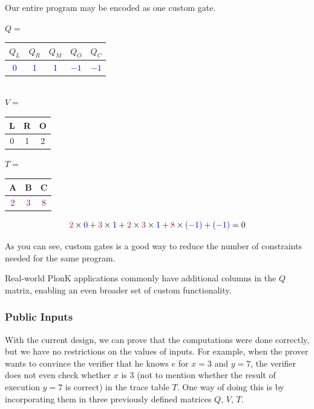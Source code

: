 \documentclass[../../book.tex]{subfiles}
\begin{document}
\begin{example}
Our entire program may be encoded as one custom gate.
\begin{center}
$Q=$ 
\begin{tabular}{|c|c|c|c|c|}
\hline
\rowcolor{gray!30}$Q_L$ & $Q_R$ & $Q_M$ & $Q_O$ & $Q_C$ \\ 
\hline
\textcolor{blue}{0} & \textcolor{blue}{1} & \textcolor{blue}{1} & \textcolor{blue}{$-1$} & \textcolor{blue}{$-1$} \\ 
\hline
\end{tabular}
\vspace{0.2cm}
\\ $V=$
\begin{tabular}{|c|c|c|}
\hline
\rowcolor{gray!30}L & R & O \\
\hline
0 & 1 & 2 \\
\hline
\end{tabular}
\quad $T=$
\begin{tabular}{|c|c|c|}
\hline
\rowcolor{gray!30}A & B & C \\
\hline
\textcolor{purple}{2} & \textcolor{purple}{3} & \textcolor{purple}{8} \\
\hline
\end{tabular}

\[\textcolor{purple}{2} \times \textcolor{blue}{0} + \textcolor{purple}{3} \times \textcolor{blue}{1} + \textcolor{purple}{2} \times \textcolor{purple}{3} \times \textcolor{blue}{1} + \textcolor{purple}{8} \times \textcolor{blue}{(-1)} + \textcolor{blue}{(-1)} = 0\]
\end{center}
As you can see, custom gates is a good way to reduce the number of constraints needed for the same program.
\end{example}

\begin{remark}
Real-world PlonK applications commonly have additional columns in the $Q$ matrix, enabling an even broader set of custom functionality.
\end{remark}

\subsubsection{Public Inputs}
With the current design, we can prove that the computations were done correctly,
but we have no restrictions on the values of inputs. For example, when the
prover wants to convince the verifier that he knows $e$ for $x=3$ and $y=7$, the
verifier does not even check whether $x$ is $3$ (not to mention whether the
result of execution $y=7$ is correct) in the trace table $T$. One way of doing
this is by incorporating them in three previously defined matrices $Q$, $V$,
$T$.
\end{document}
